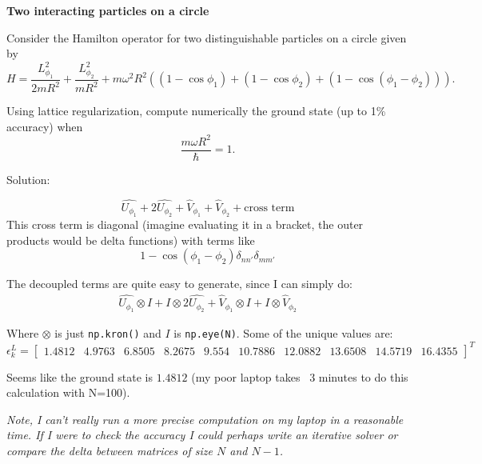     \newpage
    \begin{homeworkProblem}
        \textbf{Two interacting particles on a circle}

        Consider the Hamilton operator for two distinguishable particles on a circle given by
        \[
            H = \frac{L_{\phi_1}^2}{2mR^2} + \frac{L_{\phi_2}^2}{mR^2} + m\omega^2R^2 \left( (1-\cos\phi_1) + (1-\cos\phi_2) + (1-\cos(\phi_1-\phi_2)) \right).
        \]

        Using lattice regularization, compute numerically the ground state (up to 1\% accuracy) when
        \[
            \frac{m\omega R^2}{\hbar} = 1.
        \]
        \begin{callout}{Solution:}

            $$\hat{U_{\phi_1}} + 2 \hat{U_{\phi_2}} + \hat{V}_{\phi_1} + \hat{V}_{\phi_2} + \text{cross term}$$
            This cross term is diagonal (imagine evaluating it in a bracket, the outer products would be delta functions) with terms like
            $$1-\cos(\phi_1 - \phi_2) \delta_{nn'}\delta_{mm'}$$

            The decoupled terms are quite easy to generate, since I can simply do:
            \begin{align*}
                \hat{U_{\phi_1}}\otimes I + I\otimes 2 \hat{U_{\phi_2}} + \hat{V}_{\phi_1}\otimes I + I \otimes \hat{V}_{\phi_2}
            \end{align*}

            Where $\otimes$ is just \verb|np.kron()| and $I$ is \verb|np.eye(N)|. Some of the unique values are:
            $$\epsilon_k^L = \begin{bmatrix} 1.4812 & 4.9763 & 6.8505 & 8.2675 & 9.554 & 10.7886 & 12.0882 & 13.6508 & 14.5719 & 16.4355 \end{bmatrix}^T$$

            Seems like the ground state is $1.4812$ (my poor laptop takes ~3 minutes to do this calculation with N=100). 

            \vspace{1em}
            \textit{Note, I can't really run a more precise computation on my laptop in a reasonable time. If I were to check the accuracy I could perhaps write an iterative solver or compare the delta between matrices of size $N$ and $N-1$.}

        \end{callout}
    \end{homeworkProblem}

